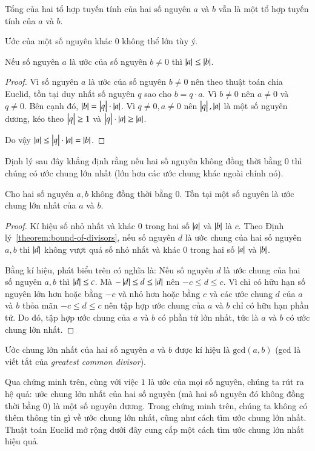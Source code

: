 Tổng của hai tổ hợp tuyến tính của hai số nguyên $a$ và $b$ vẫn là một tổ hợp tuyến tính của $a$ và $b$.

Ước của một số nguyên khác $0$ không thể lớn tùy ý.
\begin{theorem}\label{theorem:bound-of-divisors}
	Nếu số nguyên $a$ là ước của số nguyên $b\ne 0$ thì $\left\vert{a}\right\vert\leq \left\vert{b}\right\vert$.
\end{theorem}

\begin{proof}
	Vì số nguyên $a$ là ước của số nguyên $b\ne 0$ nên theo thuật toán chia Euclid, tồn tại duy nhất số nguyên $q$ sao cho $b = q\cdot a$. Vì $b\ne 0$ nên $a\ne 0$ và $q\ne 0$. Bên cạnh đó, $\left\vert{b}\right\vert = \left\vert{q}\right\vert\cdot\left\vert{a}\right\vert$. Vì $q\ne 0, a\ne 0$ nên $\left\vert{q}\right\vert, \left\vert{a}\right\vert$ là một số nguyên dương, kéo theo $\left\vert{q}\right\vert\geq 1$ và $\left\vert{q}\right\vert\cdot\left\vert{a}\right\vert \geq \left\vert{a}\right\vert$.

	Do vậy $\left\vert{a}\right\vert\leq \left\vert{q}\right\vert\cdot\left\vert{a}\right\vert = \left\vert{b}\right\vert$.
\end{proof}

Định lý sau đây khẳng định rằng nếu hai số nguyên không đồng thời bằng $0$ thì chúng có ước chung lớn nhất (lớn hơn các ước chung khác ngoài chính nó).
\begin{theorem}
	Cho hai số nguyên $a, b$ không đồng thời bằng $0$. Tồn tại một số nguyên là ước chung lớn nhất của $a$ và $b$.
\end{theorem}

\begin{proof}
	Kí hiệu số nhỏ nhất và khác $0$ trong hai số $\left\vert{a}\right\vert$ và $\left\vert{b}\right\vert$ là $c$. Theo Định lý~\ref{theorem:bound-of-divisors}, nếu số nguyên $d$ là ước chung của hai số nguyên $a, b$ thì $\left\vert{d}\right\vert$ không vượt quá số nhỏ nhất và khác $0$ trong hai số $\left\vert{a}\right\vert$ và $\left\vert{b}\right\vert$.

	Bằng kí hiệu, phát biểu trên có nghĩa là: Nếu số nguyên $d$ là ước chung của hai số nguyên $a, b$ thì $\left\vert{d}\right\vert\leq c$. Mà $-\left\vert{d}\right\vert\leq d \leq \left\vert{d}\right\vert$ nên $-c\leq d\leq c$. Vì chỉ có hữu hạn số nguyên lớn hơn hoặc bằng $-c$ và nhỏ hơn hoặc bằng $c$ và các ước chung $d$ của $a$ và $b$ thỏa mãn $-c\leq d\leq c$ nên tập hợp ước chung của $a$ và $b$ chỉ có hữu hạn phần tử. Do đó, tập hợp ước chung của $a$ và $b$ có phần tử lớn nhất, tức là $a$ và $b$ có ước chung lớn nhất.
\end{proof}

Ước chung lớn nhất của hai số nguyên $a$ và $b$ được kí hiệu là $\text{gcd}(a, b)$ (gcd là viết tắt của \textit{greatest common divisor}).

Qua chứng minh trên, cùng với việc $1$ là ước của mọi số nguyên, chúng ta rút ra hệ quả: ước chung lớn nhất của hai số nguyên (mà hai số nguyên đó không đồng thời bằng $0$) là một số nguyên dương. Trong chứng minh trên, chúng ta không có thêm thông tin gì về ước chung lớn nhất, cũng như cách tìm ước chung lớn nhất. Thuật toán Euclid mở rộng dưới đây cung cấp một cách tìm ước chung lớn nhất hiệu quả.

